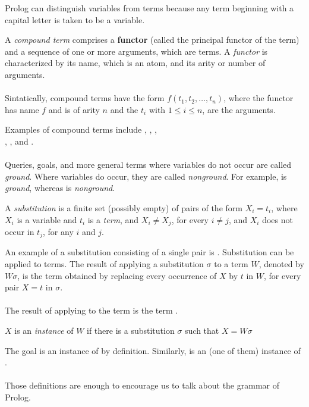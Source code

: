 Prolog can distinguish variables from terms because any term beginning with a capital letter is taken to be a variable.\\
\begin{definition*}
	A \textit{compound term} comprises a \textbf{functor} (called the principal functor of the term) and a sequence of one or more arguments, which are terms. A \textit{functor} is characterized by its name, which is an atom, and its arity or number of arguments.\\\\
	Sintatically, compound terms have the form $f(t_1, t_2, \ldots, t_n)$, where the functor has name $f$ and is of arity $n$ and the $t_i$ with $1 \leq i \leq n$, are the arguments.\\
\end{definition*}
Examples of compound terms include , , , \\ , , and .\\\\
Queries, goals, and more general terms where variables do not occur are called \textit{ground}. Where variables do occur, they are called \textit{nonground}. For example,  is \textit{ground}, whereas  is \textit{nonground}.\\
\begin{definition*}[Substitution]
	A \textit{substitution} is a finite set (possibly empty) of pairs of the form $X_i = t_i$, where $X_i$ is a variable and $t_i$ is a \textit{term}, and $X_i \neq X_j$, for every $i \neq j$, and $X_i$ does not occur in $t_j$, for any $i$ and $j$.
\end{definition*}
An example of a substitution consisting of a single pair is . Substitution can be applied to terms. The result of applying a substitution $\sigma$  to a term $W$, denoted by $W \sigma$, is the term obtained by replacing every occurrence of $X$ by $t$ in $W$, for every pair $X=t$ in $\sigma$.\\\\
The result of applying  to the term  is the term .\\
\begin{definition*}[Instance]
	$X$ is an \textit{instance} of $W$ if there is a substitution $\sigma$ such that $X = W \sigma$
\end{definition*}
The goal  is an instance of  by definition. Similarly,  is an (one of them) instance of .\\\\
Those definitions are enough to encourage us to talk about the grammar of Prolog.
